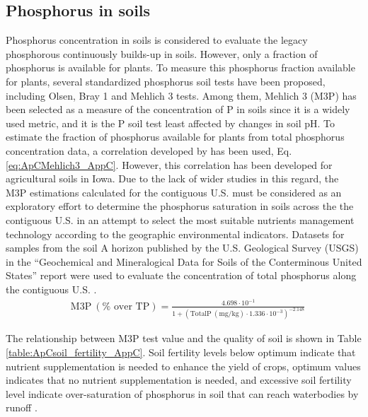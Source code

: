 \begin{refsection}[referencesCh4]
\subsection{Phosphorus in soils}
Phosphorus concentration in soils is considered to evaluate the legacy phosphorous continuously builds-up in soils. However, only a fraction of phosphorus is available for plants. To measure this phosphorus fraction available for plants, several standardized phosphorus soil tests have been proposed, including Olsen, Bray 1 and Mehlich 3 tests. Among them,  Mehlich 3 (M3P) has been selected as a measure of the concentration of P in soils since it is a widely used metric, and it is the P soil test least affected by changes in soil pH. To estimate the fraction of phosphorus available for plants from total phosphorus concentration data, a correlation developed by \citet{AllenMallarino2006} has been used, Eq. \ref{eq:ApCMehlich3_AppC}. However, this correlation has been developed for agricultural soils in Iowa. Due to the lack of wider studies in this regard, the M3P estimations calculated for the contiguous U.S. must be considered as an exploratory effort to determine the phosphorus saturation in soils across the the contiguous U.S. in an attempt to select the most suitable nutrients management technology according to the geographic environmental indicators. Datasets for samples from the soil A horizon published by the U.S. Geological Survey (USGS) in the ``Geochemical and Mineralogical Data for Soils of the Conterminous United States'' report were used to evaluate the concentration of total phosphorus along the contiguous U.S. \citep{SoilsUSGS}.
\begin{align}
& \text{M3P} \ (\% \text{ over TP}) = \frac{4.698 \cdot 10^{-1}}{1+\left(\text{TotalP} \ (\text{mg}/\text{kg}) \cdot 1.336 \cdot 10^{-3}\right)^{-2.148}} \label{eq:ApCMehlich3_AppC}
\end{align}

The relationship between M3P test value and the quality of soil is shown in Table \ref{table:ApCsoil_fertility_AppC}. Soil fertility levels below optimum indicate that nutrient supplementation is needed to enhance the yield of crops, optimum values indicates that no nutrient supplementation is needed, and excessive soil fertility level indicate over-saturation of phosphorus in soil that can reach waterbodies by runoff \citep{Espinoza2006}.


\end{refsection}
